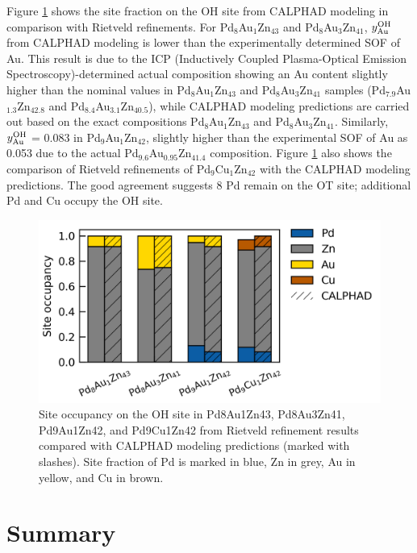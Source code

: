 Figure \ref{intermetallics:fig:PdZnM-SFCalExp} shows the site fraction on the OH site from CALPHAD modeling in comparison with Rietveld refinements. For Pd$_8$Au$_1$Zn$_{43}$ and Pd$_8$Au$_3$Zn$_{41}$, $y_{\rm Au}^{\rm OH}$ from CALPHAD modeling is lower than the experimentally determined SOF of Au. This result is due to the ICP (Inductively Coupled Plasma-Optical Emission Spectroscopy)-determined actual composition showing an Au content slightly higher than the nominal values in Pd$_8$Au$_1$Zn$_{43}$ and Pd$_8$Au$_3$Zn$_{41}$ samples (Pd$_{7.9}$Au$_{1.3}$Zn$_{42.8}$ and Pd$_{8.4}$Au$_{3.1}$Zn$_{40.5}$), while CALPHAD modeling predictions are carried out based on the exact compositions Pd$_8$Au$_1$Zn$_{43}$ and Pd$_8$Au$_3$Zn$_{41}$. Similarly, $y_{\rm Au}^{\rm OH}$ = 0.083 in Pd$_9$Au$_1$Zn$_{42}$, slightly higher than the experimental SOF of Au as 0.053 due to the actual Pd$_{9.6}$Au$_{0.95}$Zn$_{41.4}$ composition. Figure \ref{intermetallics:fig:PdZnM-SFCalExp} also shows the comparison of Rietveld refinements of Pd$_9$Cu$_1$Zn$_42$ with the CALPHAD modeling predictions. The good agreement suggests 8 Pd remain on the OT site; additional Pd and Cu occupy the OH site. 

\begin{figure}[H]
    \centering
    \includegraphics[width=0.8\linewidth]{intermetallics/Intermetallics-PdZnM-SFCalExp.png}
    \caption{Site occupancy on the OH site in Pd8Au1Zn43, Pd8Au3Zn41, Pd9Au1Zn42, and Pd9Cu1Zn42 from Rietveld refinement results compared with CALPHAD modeling predictions (marked with slashes). Site fraction of Pd is marked in blue, Zn in grey, Au in yellow, and Cu in brown.}
    \label{intermetallics:fig:PdZnM-SFCalExp}
\end{figure}

\section{Summary} \label{intermetallics:sec:Summary}

